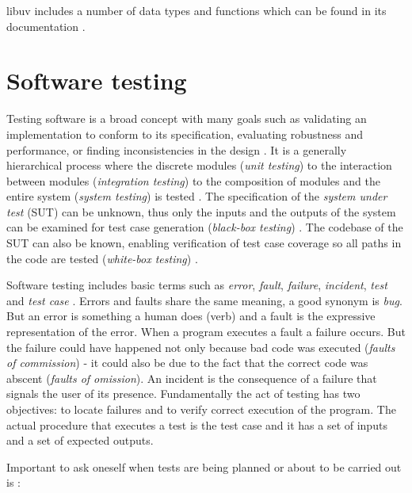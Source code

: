 libuv includes a number of data types and functions which can be found in its
documentation \cite{libuv-docs}.

\section{Software testing}

Testing software is a broad concept with many goals such as validating an
implementation to conform to its specification, evaluating robustness and
performance, or finding inconsistencies in the design
\cite{bertolino2007software}. It is a generally hierarchical process where the
discrete modules (\textit{unit testing}) to the interaction between modules
(\textit{integration testing}) to the composition of modules and the entire
system (\textit{system testing}) is tested \cite{raymond1998automatic}. The
specification of the \textit{system under test} (SUT) can be unknown, thus only
the inputs and the outputs of the system can be examined for test case
generation (\textit{black-box testing}) \cite{jorgensen2016software}. The
codebase of the SUT can also be known, enabling verification of test case
coverage so all paths in the code are tested (\textit{white-box testing})
\cite{jorgensen2016software}.

Software testing includes basic terms such as \textit{error}, \textit{fault},
\textit{failure}, \textit{incident}, \textit{test} and \textit{test case}
\cite{radatz1990ieee}. Errors and faults share the same meaning, a good synonym
is \textit{bug}. But an error is something a human does (verb) and a fault is
the expressive representation of the error. When a program executes a fault a
failure occurs. But the failure could have happened not only because bad code
was executed (\textit{faults of commission}) - it could also be due to the fact
that the correct code was abscent (\textit{faults of omission}). An incident is
the consequence of a failure that signals the user of its presence.
Fundamentally the act of testing has two objectives: to locate failures and to
verify correct execution of the program. The actual procedure that executes a
test is the test case and it has a set of inputs and a set of expected outputs.
\cite{jorgensen2016software}

Important to ask oneself when tests are being planned or about to be carried
out is \cite{bertolino2007software}:


